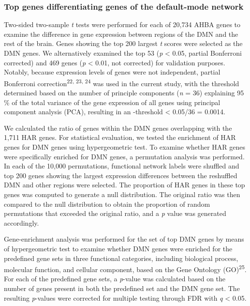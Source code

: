 \begin{refsection}
\subsubsection*{Top genes differentiating genes of the default-mode network}
Two-sided two-sample \textit{t} tests were performed for each of 20,734 AHBA genes to examine the difference in gene expression between regions of the DMN and the rest of the brain. Genes showing the top 200 largest \textit{t} scores were selected as the DMN genes. We alternatively examined the top 53 (\textit{p} < 0.05, partial Bonferroni corrected) and 469 genes (\textit{p} < 0.01, not corrected) for validation purposes. Notably, because expression levels of genes were not independent, partial Bonferroni correction\textsuperscript{22, 23, 24} was used in the current study, with the threshold determined based on the number of principle components (\textit{n} = 36) explaining 95$\%$  of the total variance of the gene expression of all genes using principal component analysis (PCA), resulting in an \textit{\textalpha}-threshold < 0.05/36 = 0.0014.

We calculated the ratio of genes within the DMN genes overlapping with the 1,711 HAR genes. For statistical evaluation, we tested the enrichment of HAR genes for DMN genes using hypergeometric test. To examine whether HAR genes were specifically enriched for DMN genes, a permutation analysis was performed. In each of the 10,000 permutations, functional network labels were shuffled and top 200 genes showing the largest expression differences between the reshuffled DMN and other regions were selected. The proportion of HAR genes in these top genes was computed to generate a null distribution. The original ratio was then compared to the null distribution to obtain the proportion of random permutations that exceeded the original ratio, and a \textit{p} value was generated accordingly.

Gene-enrichment analysis was performed for the set of top DMN genes by means of hypergeometric test to examine whether DMN genes were enriched for the predefined gene sets in three functional categories, including biological process, molecular function, and cellular component, based on the Gene Ontology (GO)\textsuperscript{25}. For each of the predefined gene sets, a \textit{p}-value was calculated based on the number of genes present in both the predefined set and the DMN gene set. The resulting \textit{p}-values were corrected for multiple testing through FDR with \textit{q} < 0.05. 


\end{refsection}
